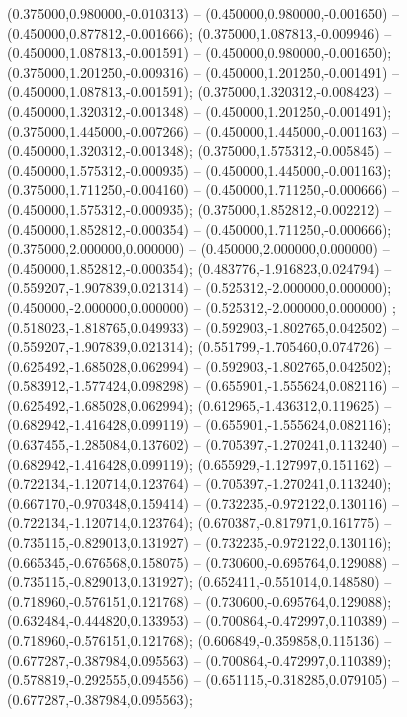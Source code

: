  (0.375000,0.980000,-0.010313) -- (0.450000,0.980000,-0.001650) -- (0.450000,0.877812,-0.001666);
 (0.375000,1.087813,-0.009946) -- (0.450000,1.087813,-0.001591) -- (0.450000,0.980000,-0.001650);
 (0.375000,1.201250,-0.009316) -- (0.450000,1.201250,-0.001491) -- (0.450000,1.087813,-0.001591);
 (0.375000,1.320312,-0.008423) -- (0.450000,1.320312,-0.001348) -- (0.450000,1.201250,-0.001491);
 (0.375000,1.445000,-0.007266) -- (0.450000,1.445000,-0.001163) -- (0.450000,1.320312,-0.001348);
 (0.375000,1.575312,-0.005845) -- (0.450000,1.575312,-0.000935) -- (0.450000,1.445000,-0.001163);
 (0.375000,1.711250,-0.004160) -- (0.450000,1.711250,-0.000666) -- (0.450000,1.575312,-0.000935);
 (0.375000,1.852812,-0.002212) -- (0.450000,1.852812,-0.000354) -- (0.450000,1.711250,-0.000666);
 (0.375000,2.000000,0.000000) -- (0.450000,2.000000,0.000000) -- (0.450000,1.852812,-0.000354);
 (0.483776,-1.916823,0.024794) -- (0.559207,-1.907839,0.021314) -- (0.525312,-2.000000,0.000000);
 (0.450000,-2.000000,0.000000) -- (0.525312,-2.000000,0.000000) ;
 (0.518023,-1.818765,0.049933) -- (0.592903,-1.802765,0.042502) -- (0.559207,-1.907839,0.021314);
 (0.551799,-1.705460,0.074726) -- (0.625492,-1.685028,0.062994) -- (0.592903,-1.802765,0.042502);
 (0.583912,-1.577424,0.098298) -- (0.655901,-1.555624,0.082116) -- (0.625492,-1.685028,0.062994);
 (0.612965,-1.436312,0.119625) -- (0.682942,-1.416428,0.099119) -- (0.655901,-1.555624,0.082116);
 (0.637455,-1.285084,0.137602) -- (0.705397,-1.270241,0.113240) -- (0.682942,-1.416428,0.099119);
 (0.655929,-1.127997,0.151162) -- (0.722134,-1.120714,0.123764) -- (0.705397,-1.270241,0.113240);
 (0.667170,-0.970348,0.159414) -- (0.732235,-0.972122,0.130116) -- (0.722134,-1.120714,0.123764);
 (0.670387,-0.817971,0.161775) -- (0.735115,-0.829013,0.131927) -- (0.732235,-0.972122,0.130116);
 (0.665345,-0.676568,0.158075) -- (0.730600,-0.695764,0.129088) -- (0.735115,-0.829013,0.131927);
 (0.652411,-0.551014,0.148580) -- (0.718960,-0.576151,0.121768) -- (0.730600,-0.695764,0.129088);
 (0.632484,-0.444820,0.133953) -- (0.700864,-0.472997,0.110389) -- (0.718960,-0.576151,0.121768);
 (0.606849,-0.359858,0.115136) -- (0.677287,-0.387984,0.095563) -- (0.700864,-0.472997,0.110389);
 (0.578819,-0.292555,0.094556) -- (0.651115,-0.318285,0.079105) -- (0.677287,-0.387984,0.095563);
